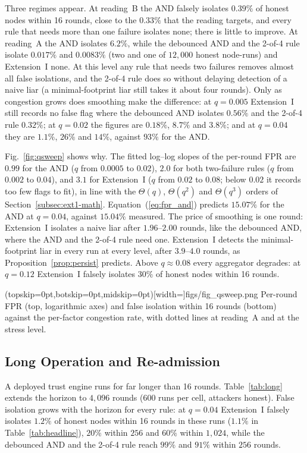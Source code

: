 Three regimes appear.  At reading~B the AND falsely isolates $0.39\%$
of honest nodes within 16 rounds, close to the $0.33\%$ that the
reading targets, and every rule that needs more than one failure
isolates none; there is little to improve.  At reading~A the AND
isolates $6.2\%$, while the debounced AND and the 2-of-4 rule isolate
$0.017\%$ and $0.0083\%$ (two and one of $12{,}000$ honest node-runs)
and Extension~I none.  At this level any rule that needs two failures
removes almost all false isolations, and the 2-of-4 rule does so
without delaying detection of a naive liar (a minimal-footprint liar
still takes it about four rounds).  Only as congestion grows does smoothing
make the difference: at $q=0.005$ Extension~I still records no false
flag where the debounced AND isolates $0.56\%$ and the 2-of-4 rule
$0.32\%$; at $q=0.02$ the figures are $0.18\%$, $8.7\%$ and $3.8\%$;
and at $q=0.04$ they are $1.1\%$, $26\%$ and $14\%$, against $93\%$
for the AND.

Fig.~\ref{fig:qsweep} shows why.  The fitted log--log slopes of the
per-round FPR are $0.99$ for the AND ($q$ from $0.0005$ to $0.02$),
$2.0$ for both two-failure rules ($q$ from $0.002$ to $0.04$), and
$3.1$ for Extension~I ($q$ from $0.02$ to $0.08$; below $0.02$ it
records too few flags to fit), in line with the $\Theta(q)$,
$\Theta(q^{2})$ and $\Theta(q^{3})$ orders of
Section~\ref{subsec:ext1-math}.  Equation~(\ref{eq:fpr_and}) predicts
$15.07\%$ for the AND at $q=0.04$, against $15.04\%$ measured.  The
price of smoothing is one round: Extension~I isolates a naive liar after
$1.96$--$2.00$ rounds, like the debounced AND, where the AND and the
2-of-4 rule need one.  Extension~I detects the minimal-footprint liar
in every run at every level, after $3.9$--$4.0$ rounds, as
Proposition~\ref{prop:persist} predicts.  Above $q\approx0.08$ every
aggregator degrades: at $q=0.12$ Extension~I falsely isolates $30\%$
of honest nodes within 16 rounds.

\Figure[!t](topskip=0pt,botskip=0pt,midskip=0pt)[width=\columnwidth]{figs/fig_qsweep.png}
{Per-round FPR (top, logarithmic axes) and false isolation within 16 rounds (bottom) against the per-factor congestion rate, with dotted lines at reading~A and at the stress level.\label{fig:qsweep}}

\subsection{Long Operation and Re-admission}
\label{sec:res-long}
A deployed trust engine runs for far longer than 16 rounds.
Table~\ref{tab:long} extends the horizon to
$4{,}096$ rounds ($600$ runs per cell, attackers honest).  False
isolation grows with the horizon for every rule: at $q=0.04$
Extension~I falsely isolates $1.2\%$ of honest nodes within 16 rounds
in these runs ($1.1\%$ in Table~\ref{tab:headline}), $20\%$ within
$256$ and $60\%$ within $1{,}024$, while the debounced AND and the
2-of-4 rule reach $99\%$ and $91\%$ within $256$ rounds.

